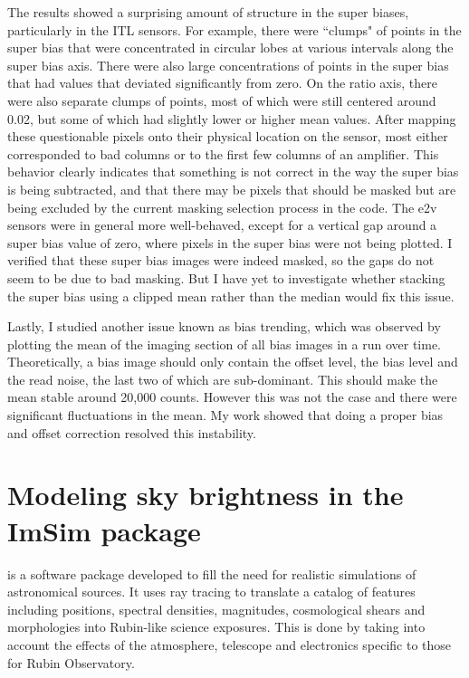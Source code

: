 The results showed a surprising amount of structure in the super biases, particularly in the ITL sensors. For example, there were ``clumps" of points in the super bias that were concentrated in circular lobes at various intervals along the super bias axis. There were also large concentrations of points in the super bias that had values that deviated significantly from zero. On the ratio axis, there were also separate clumps of points, most of which were still centered around 0.02, but some of which had slightly lower or higher mean values. After mapping these questionable pixels onto their physical location on the sensor, most either corresponded to bad columns or to the first few columns of an amplifier. This behavior clearly indicates that something is not correct in the way the super bias is being subtracted, and that there may be pixels that should be masked but are being excluded by the current masking selection process in the  code. The e2v sensors were in general more well-behaved, except for a vertical gap around a super bias value of zero, where pixels in the super bias were not being plotted. I verified that these super bias images were indeed masked, so the gaps do not seem to be due to bad masking. But I have yet to investigate whether stacking the super bias using a clipped mean rather than the median would fix this issue. 

Lastly, I studied another issue known as bias trending, which was observed by plotting the mean of the imaging section of all bias images in a run over time. Theoretically, a bias image should only contain the offset level, the bias level and the read noise, the last two of which are sub-dominant. This should make the mean stable around 20,000 counts. However this was not the case and there were significant fluctuations in the mean. My work showed that doing a proper bias and offset correction resolved this instability.


\section{Modeling sky brightness in the ImSim package}

 is a software package developed to fill the need for realistic simulations of astronomical sources. It uses ray tracing to translate a catalog of features including positions, spectral densities, magnitudes, cosmological shears and morphologies into Rubin-like science exposures. This is done by taking into account the effects of the atmosphere, telescope and electronics specific to those for Rubin Observatory. 

